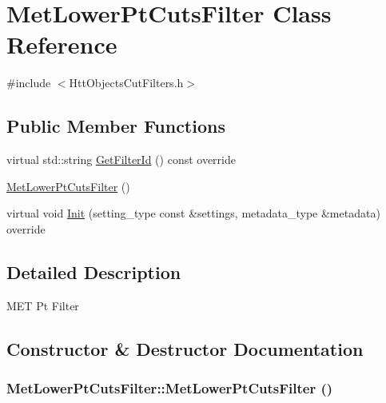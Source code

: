 \hypertarget{classMetLowerPtCutsFilter}{
\section{MetLowerPtCutsFilter Class Reference}
\label{classMetLowerPtCutsFilter}
}


{\ttfamily \#include $<$HttObjectsCutFilters.h$>$}\subsection*{Public Member Functions}
\begin{DoxyCompactItemize}
\item 
virtual std::string \hyperlink{classMetLowerPtCutsFilter_aa0a2851e6e009456638d61df400d6ab7}{GetFilterId} () const override
\item 
\hyperlink{classMetLowerPtCutsFilter_aa81be6f256302408ad1fc21e206a15e5}{MetLowerPtCutsFilter} ()
\item 
virtual void \hyperlink{classMetLowerPtCutsFilter_a2788270dc0767971a9bf381fa98d031d}{Init} (setting\_\-type const \&settings, metadata\_\-type \&metadata) override
\end{DoxyCompactItemize}


\subsection{Detailed Description}
MET Pt Filter 

\subsection{Constructor \& Destructor Documentation}
\hypertarget{classMetLowerPtCutsFilter_aa81be6f256302408ad1fc21e206a15e5}{
\subsubsection[{MetLowerPtCutsFilter}]{\setlength{\rightskip}{0pt plus 5cm}MetLowerPtCutsFilter::MetLowerPtCutsFilter ()}}
\label{classMetLowerPtCutsFilter_aa81be6f256302408ad1fc21e206a15e5}


